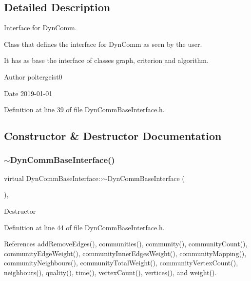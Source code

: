 \subsection{Detailed Description}
Interface for Dyn\+Comm. 

Class that defines the interface for Dyn\+Comm as seen by the user.

It has as base the interface of classes graph, criterion and algorithm.

\begin{DoxyAuthor}{Author}
poltergeist0
\end{DoxyAuthor}
\begin{DoxyDate}{Date}
2019-\/01-\/01 
\end{DoxyDate}


Definition at line 39 of file Dyn\+Comm\+Base\+Interface.\+h.



\subsection{Constructor \& Destructor Documentation}
\mbox{\label{classDynCommBaseInterface_a1bc41ad0bdef6a4d8370ba640a271b33}} 
\subsubsection{\texorpdfstring{$\sim$\+Dyn\+Comm\+Base\+Interface()}{~DynCommBaseInterface()}}
{\footnotesize\ttfamily virtual Dyn\+Comm\+Base\+Interface\+::$\sim$\+Dyn\+Comm\+Base\+Interface (\begin{DoxyParamCaption}{ }\end{DoxyParamCaption})\hspace{0.3cm}{\ttfamily [inline]}, {\ttfamily [virtual]}}

Destructor 

Definition at line 44 of file Dyn\+Comm\+Base\+Interface.\+h.



References add\+Remove\+Edges(), communities(), community(), community\+Count(), community\+Edge\+Weight(), community\+Inner\+Edges\+Weight(), community\+Mapping(), community\+Neighbours(), community\+Total\+Weight(), community\+Vertex\+Count(), neighbours(), quality(), time(), vertex\+Count(), vertices(), and weight().

